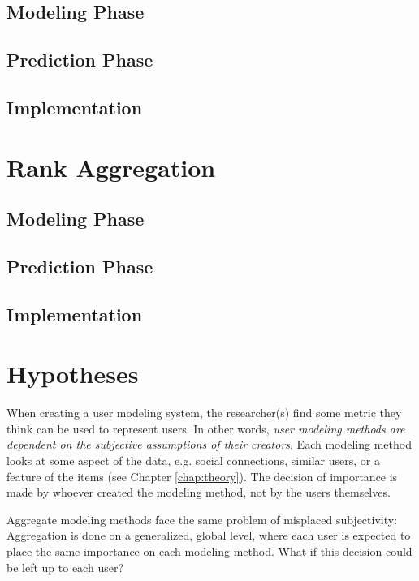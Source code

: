 \subsection{Modeling Phase}

\subsection{Prediction Phase}

\subsection{Implementation}



\section{Rank Aggregation}

\subsection{Modeling Phase}

\subsection{Prediction Phase}

\subsection{Implementation}



\clearpage

\section{Hypotheses}

When creating a user modeling system, the researcher(s) find some metric they think can be used
to represent users. In other words,
\emph{user modeling methods are dependent on the subjective assumptions of their creators}.
Each modeling method looks at some aspect of the data, e.g. social connections, similar users,
or a feature of the items (see Chapter \ref{chap:theory}). 
The decision of importance is made by whoever created the modeling method, not by the users themselves.

Aggregate modeling methods face the same problem of misplaced subjectivity: 
Aggregation is done on a generalized, global level,
where each user is expected to place the same importance on each modeling method.
What if this decision could be left up to each user?

